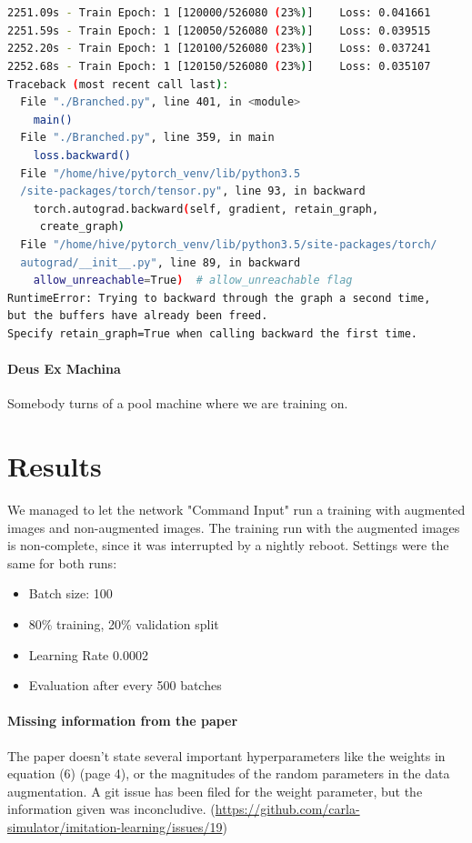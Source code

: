 \documentclass[a4paper]{article}
\begin{document}
\begin{lstlisting}[language=bash, caption={Nigthly Reboot Interruption}]


2251.09s - Train Epoch: 1 [120000/526080 (23%)]    Loss: 0.041661
2251.59s - Train Epoch: 1 [120050/526080 (23%)]    Loss: 0.039515
2252.20s - Train Epoch: 1 [120100/526080 (23%)]    Loss: 0.037241
2252.68s - Train Epoch: 1 [120150/526080 (23%)]    Loss: 0.035107
Traceback (most recent call last):
  File "./Branched.py", line 401, in <module>
    main()
  File "./Branched.py", line 359, in main
    loss.backward()
  File "/home/hive/pytorch_venv/lib/python3.5
  /site-packages/torch/tensor.py", line 93, in backward
    torch.autograd.backward(self, gradient, retain_graph,
     create_graph)
  File "/home/hive/pytorch_venv/lib/python3.5/site-packages/torch/
  autograd/__init__.py", line 89, in backward
    allow_unreachable=True)  # allow_unreachable flag
RuntimeError: Trying to backward through the graph a second time, 
but the buffers have already been freed. 
Specify retain_graph=True when calling backward the first time.

\end{lstlisting}

\paragraph{Deus Ex Machina} Somebody turns of a pool machine where we are training on.

\section{Results}
We managed to let the network "Command Input" run a training with augmented images and non-augmented images.
The training run with the augmented images is non-complete, since it was interrupted by a nightly reboot.
Settings were the same for both runs:
\begin{itemize}
	\item Batch size: 100
	\item 80\% training, 20\% validation split
	\item Learning Rate 0.0002
	\item Evaluation after every 500 batches
  \end{itemize}

\paragraph{Missing information from the paper} The paper doesn't state several
important hyperparameters like the weights in equation (6) (page 4), or the
magnitudes of the random parameters in the data augmentation. A git issue has
been filed for the weight parameter, but the information given was inconcludive.
(\url{https://github.com/carla-simulator/imitation-learning/issues/19})
\end{document}
